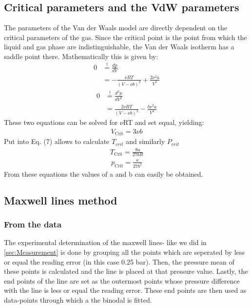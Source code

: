 \documentclass[a4paper,10pt,twocolumn]{article}
\begin{document}
    \subsection{Critical parameters and the VdW parameters}\label{subsec:criticalParams}
    The parameters of the Van der Waals model are directly dependent on the critical parameters of the gas.
    Since the critical point is the point from which the liquid and gas phase are indistinguishable, the Van der Waals isotherm has a saddle point there.
    Mathematically this is given by:
    \begin{equation}\label{eq:anh1}
    \begin{split}
        0 & \overset{!}{=}\frac{dp}{dV}\\
        & =-\frac{\nu R T}{(V-\nu b)^2}+\frac{2 \nu^2 a}{V^3}
    \end{split}
    \end{equation}
\begin{equation}\label{eq:anh2}
\begin{split}
    0 & \overset{!}{=}\frac{d^2p}{dV^2}\\
    & =\frac{2 \nu R T}{(V-\nu b)^3}-\frac{b \nu^2 a}{V^4}
\end{split}
\end{equation}
These two equations can be solved for $\nu$RT and set equal, yielding:
\begin{align}
    V_\text{Crit} = 3\nu b
\end{align}
Put into Eq. (7) allows to calculate $T_{crit}$ and similarly $P_{crit}$
\begin{align}
    T_\text{Crit}=\frac{8a}{27bR}
\end{align}
\begin{align}
    p_\text{Crit}=\frac{a}{27b^2}
\end{align}
    From these equations the values of a and b can easily be obtained.
    \subsection{Maxwell lines method}\label{subsec:maxwellMethod}
    \subsubsection{From the data}\label{subsubsec:maxwellFormData}
    The experimental determination of the maxwell lines- like we did in \ref{sec:Measurement} is done by  grouping all the points which are seperated by less or equal the reading error (in this case 0.25 bar).
    Then, the pressure mean of these points is calculated and the line is placed at that pressure value. 
    Lastly, the end points of the line are set as the outermost points whose pressure difference with the line is less or equal the reading error.
    These end points are then used as data-points through which a the binodal is fitted.
\end{document}
